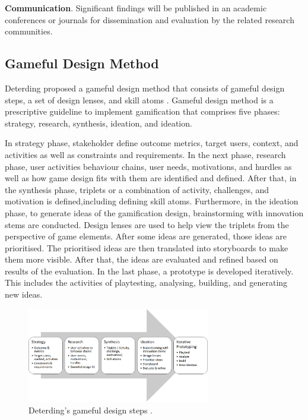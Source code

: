 \documentclass[12pt, a4paper]{report}
\begin{document}
\textbf{Communication}. Significant findings will be published in an academic conferences or journals for dissemination and evaluation by the related research communities.


 
\subsection{Gameful Design Method}
Deterding proposed a gameful design method that consists of gameful design steps, a set of design lenses, and skill atoms \cite{deterding2015lens}. Gameful design method is a prescriptive guideline to implement gamification that comprises five phases: strategy, research, synthesis, ideation, and ideation. 

In strategy phase, stakeholder define outcome metrics, target users, context, and activities as well as constraints and requirements. In the next phase, research phase, user activities behaviour chains, user needs, motivations, and hurdles as well as how game design fits with them are identified and defined. After that, in the synthesis phase, triplets or a combination of activity, challenges,  and motivation is defined,including defining skill atoms. Furthermore, in the ideation phase, to generate ideas of the gamification design, brainstorming with innovation stems are conducted. Design lenses are used to help view the triplets from the perspective of game elements. After some ideas are generated, those ideas are prioritised. The prioritised ideas are then translated into storyboards to make them more visible. After that, the ideas are evaluated and refined based on results of the evaluation. In the last phase, a prototype is developed iteratively. This includes the activities of playtesting, analysing, building, and generating new ideas.  

\begin{figure}[ht]
\centering
\includegraphics[width=8cm]{gameful-steps}
\caption{Deterding's gameful design steps \cite{deterding2015lens}.}
\label{fig:gameful-steps}
\end{figure}
\end{document}
